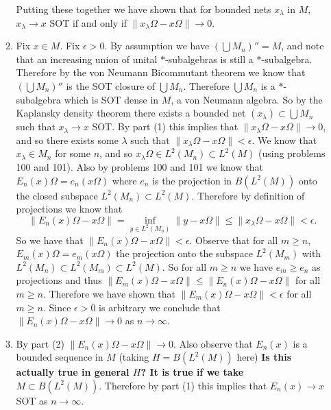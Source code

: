 \documentclass[a4paper,10pt]{report}
\begin{document}
\begin{enumerate}
\begin{enumerate}
			\newline
			\newline Putting these together we have shown that for bounded nets $x_\lambda$ in $M$, $x_\lambda \rightarrow x$ SOT if and only if $\|x_\lambda \Omega - x\Omega\| \rightarrow 0$.
			\item Fix $x\in M$.  Fix $\epsilon > 0$.  By assumption we have $(\bigcup{M_n})'' = M$, and note that an increasing union of unital $*$-subalgebras is still a $*$-subalgebra.  Therefore by the von Neumann Bicommutant theorem we know that $(\bigcup{M_n})''$ is the SOT closure of $\bigcup{M_n}$.  Therefore $\bigcup{M_n}$ is a $*$-subalgebra which is SOT dense in $M$, a von Neumann algebra.  So by the Kaplansky density theorem there exists a bounded net $(x_\lambda)\subset \bigcup{M_n}$ such that $x_\lambda \rightarrow x$ SOT.  By part (1) this implies that $\|x_\lambda \Omega - x\Omega\| \rightarrow 0$, and so there exists some $\lambda$ such that $\|x_\lambda \Omega - x\Omega\| < \epsilon$.  We know that $x_\lambda \in M_n$ for some $n$, and so $x_\lambda \Omega \in L^2(M_n) \subset L^2(M)$ (using problems 100 and 101).  Also by problems 100 and 101 we know that $E_n(x)\Omega = e_n (x\Omega)$ where $e_n$ is the projection in $B(L^2(M))$ onto the closed subspace $L^2(M_n)\subset L^2(M)$.  Therefore by definition of projections we know that $$\|E_n(x)\Omega - x\Omega \| = \inf_{y\in L^2(M_n)}{\|y - x\Omega\|} \leq \|x_\lambda \Omega - x\Omega\| < \epsilon.$$ So we have that $\|E_n(x)\Omega - x\Omega \| < \epsilon$.  Observe that for all $m\geq n$, $E_m(x)\Omega = e_m(x\Omega)$ the projection onto the subspace $L^2(M_m)$ with $L^2(M_n)\subset L^2(M_m)\subset L^2(M)$.  So for all $m\geq n$ we have $e_m\geq e_n$ as projections and thus $\|E_m(x)\Omega - x\Omega \| \leq \|E_n(x)\Omega - x\Omega \|$ for all $m\geq n$.  Therefore we have shown that $\|E_m(x)\Omega - x\Omega \| < \epsilon$ for all $m\geq n$.  Since $\epsilon > 0$ is arbitrary we conclude that $\|E_n(x)\Omega - x\Omega\| \rightarrow 0$ as $n\rightarrow \infty$.
			\item By part (2) $\|E_n(x)\Omega - x\Omega\| \rightarrow 0$.  Also observe that $E_n(x)$ is a bounded sequence in $M$ (taking $H = B(L^2(M))$ here) \textbf{Is this actually true in general $H$? It is true if we take $M\subset B(L^2(M))$}.  Therefore by part (1) this implies that $E_n(x) \rightarrow x$ SOT as $n\rightarrow \infty$.
		\end{enumerate}
\end{enumerate}
\end{document}
